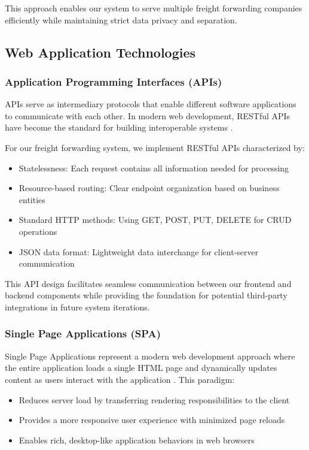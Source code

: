 This approach enables our system to serve multiple freight forwarding companies efficiently while maintaining strict data privacy and separation.

\subsection{Web Application Technologies}
\subsubsection{Application Programming Interfaces (APIs)}
APIs serve as intermediary protocols that enable different software applications to communicate with each other. In modern web development, RESTful APIs have become the standard for building interoperable systems \cite{masse2011rest}.

For our freight forwarding system, we implement RESTful APIs characterized by:
\begin{itemize}
    \item Statelessness: Each request contains all information needed for processing
    \item Resource-based routing: Clear endpoint organization based on business entities
    \item Standard HTTP methods: Using GET, POST, PUT, DELETE for CRUD operations
    \item JSON data format: Lightweight data interchange for client-server communication
\end{itemize}

This API design facilitates seamless communication between our frontend and backend components while providing the foundation for potential third-party integrations in future system iterations.

\subsubsection{Single Page Applications (SPA)}
Single Page Applications represent a modern web development approach where the entire application loads a single HTML page and dynamically updates content as users interact with the application \cite{mikowski2013spa}. This paradigm:

\begin{itemize}
    \item Reduces server load by transferring rendering responsibilities to the client
    \item Provides a more responsive user experience with minimized page reloads
    \item Enables rich, desktop-like application behaviors in web browsers
\end{itemize}

